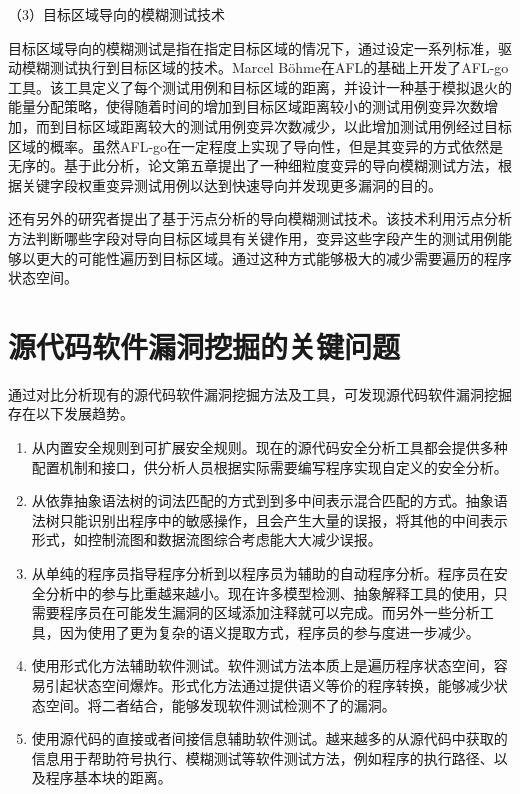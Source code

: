 （3）目标区域导向的模糊测试技术

目标区域导向的模糊测试是指在指定目标区域的情况下，通过设定一系列标准，驱动模糊测试执行到目标区域的技术。Marcel Böhme在AFL的基础上开发了AFL-go工具。该工具定义了每个测试用例和目标区域的距离，并设计一种基于模拟退火的能量分配策略，使得随着时间的增加到目标区域距离较小的测试用例变异次数增加，而到目标区域距离较大的测试用例变异次数减少，以此增加测试用例经过目标区域的概率。虽然AFL-go在一定程度上实现了导向性，但是其变异的方式依然是无序的。基于此分析，论文第五章提出了一种细粒度变异的导向模糊测试方法，根据关键字段权重变异测试用例以达到快速导向并发现更多漏洞的目的。

还有另外的研究者提出了基于污点分析的导向模糊测试技术。该技术利用污点分析方法判断哪些字段对导向目标区域具有关键作用，变异这些字段产生的测试用例能够以更大的可能性遍历到目标区域。通过这种方式能够极大的减少需要遍历的程序状态空间。


\section{源代码软件漏洞挖掘的关键问题}

通过对比分析现有的源代码软件漏洞挖掘方法及工具，可发现源代码软件漏洞挖掘存在以下发展趋势。%
\begin{enumerate}[(1)]
\item 从内置安全规则到可扩展安全规则。现在的源代码安全分析工具都会提供多种配置机制和接口，供分析人员根据实际需要编写程序实现自定义的安全分析。
\item 从依靠抽象语法树的词法匹配的方式到到多中间表示混合匹配的方式。抽象语法树只能识别出程序中的敏感操作，且会产生大量的误报，将其他的中间表示形式，如控制流图和数据流图综合考虑能大大减少误报。
\item 从单纯的程序员指导程序分析到以程序员为辅助的自动程序分析。程序员在安全分析中的参与比重越来越小。现在许多模型检测、抽象解释工具的使用，只需要程序员在可能发生漏洞的区域添加注释就可以完成。而另外一些分析工具，因为使用了更为复杂的语义提取方式，程序员的参与度进一步减少。
\item 使用形式化方法辅助软件测试。软件测试方法本质上是遍历程序状态空间，容易引起状态空间爆炸。形式化方法通过提供语义等价的程序转换，能够减少状态空间。将二者结合，能够发现软件测试检测不了的漏洞。
\item 使用源代码的直接或者间接信息辅助软件测试。越来越多的从源代码中获取的信息用于帮助符号执行、模糊测试等软件测试方法，例如程序的执行路径、以及程序基本块的距离。
\end{enumerate}

